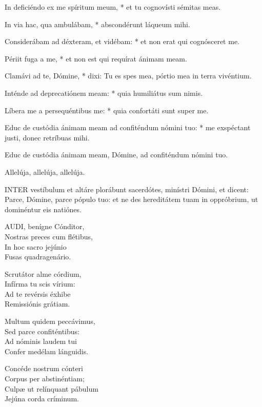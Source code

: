 In deficiéndo ex me spíritum meum, * et tu cognovísti sémitas meas.

In via hac, qua ambulábam, * abscondérunt láqueum mihi.

Considerábam ad déxteram, et vidébam: * et non erat qui cognósceret me.

Périit fuga a me, * et non est qui requírat ánimam meam.

Clamávi ad te, Dómine, * dixi: Tu es spes mea, pórtio mea in terra vivéntium.

Inténde ad deprecatiónem meam: * quia humiliátus sum nimis.

Líbera me a persequéntibus me: * quia confortáti sunt super me.

Educ de custódia ánimam meam ad confiténdum nómini tuo: * me exspéctant justi, donec retríbuas mihi.


 Educ de custódia ánimam meam, Dómine, ad confiténdum nómini tuo.


 Allelúja, allelúja, allelúja.




\lettrine[lines=2]{I}{NTER} vestíbulum et altáre plorábunt sacerdótes, minístri Dómini, et dicent: Parce, Dómine, parce pópulo tuo: et ne des hereditátem tuam in oppróbrium, ut dominéntur eis natiónes.


\lettrine[lines=2]{A}{UDI}, benígne Cónditor,\\
Nostras preces cum flétibus,\\
In hoc sacro jejúnio\\
Fusas quadragenário.

Scrutátor alme córdium,\\
Infírma tu scis vírium:\\
Ad te revérsis éxhibe\\
Remissiónis grátiam.

Multum quidem peccávimus,\\
Sed parce confiténtibus:\\
Ad nóminis laudem tui\\
Confer medélam lánguidis.

Concéde nostrum cónteri\\
Corpus per abstinéntiam;\\
Culpæ ut relínquant pábulum\\
Jejúna corda críminum.

